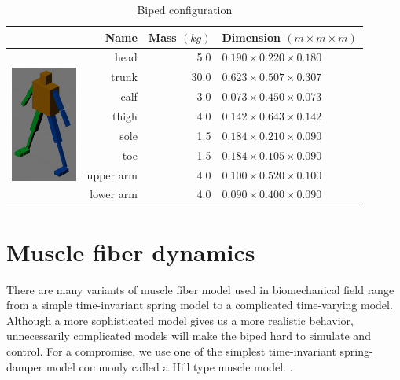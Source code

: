 \documentclass[master,english,final]{kaist-ucs}
\begin{document}
\begin{table}[h!]
\centering
  \begin{tabular}{crrl}
                                                         & Name      & Mass $(kg)$  & Dimension $(m \times m \times m)$  \\
  \hline
  \multirow{8}{*}{\includegraphics[width=0.85in]{biped}} & head      & 5.0          & $0.190 \times 0.220 \times 0.180$  \\
                                                         & trunk     & 30.0         & $0.623 \times 0.507 \times 0.307$  \\
                                                         & calf      & 3.0          & $0.073 \times 0.450 \times 0.073$  \\
                                                         & thigh     & 4.0          & $0.142 \times 0.643 \times 0.142$  \\
                                                         & sole      & 1.5          & $0.184 \times 0.210 \times 0.090$  \\
                                                         & toe       & 1.5          & $0.184 \times 0.105 \times 0.090$  \\
                                                         & upper arm & 4.0          & $0.100 \times 0.520 \times 0.100$  \\
                                                         & lower arm & 4.0          & $0.090 \times 0.400 \times 0.090$  \\
  \hline
\end{tabular}
\caption{Biped configuration}
\label{bipedconf}
\end{table}



\section{Muscle fiber dynamics}

There are many variants of muscle fiber model used in biomechanical field range
from a simple time-invariant spring model to a complicated time-varying model. \cite{25733}
Although a more sophisticated model gives us a more realistic behavior, unnecessarily
complicated models will make the biped hard to simulate and control.
For a compromise, we use one of the simplest time-invariant spring-damper model commonly called
a Hill type muscle model. \cite{hill}.
\end{document}
